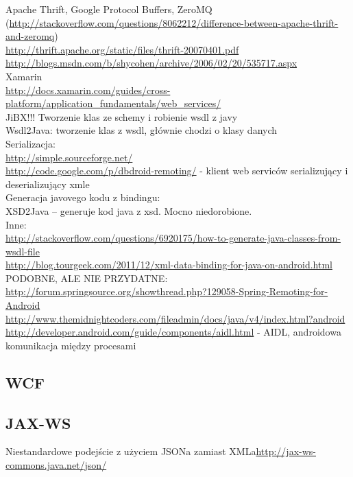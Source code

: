 \documentclass[twoside,a4paper]{book}
\begin{document}
Apache Thrift, Google Protocol Buffers, ZeroMQ (\url{http://stackoverflow.com/questions/8062212/difference-between-apache-thrift-and-zeromq})\\
\url{http://thrift.apache.org/static/files/thrift-20070401.pdf}\\
\url{http://blogs.msdn.com/b/shycohen/archive/2006/02/20/535717.aspx}\\
Xamarin\\
\url{http://docs.xamarin.com/guides/cross-platform/application_fundamentals/web_services/}\\

JiBX!!! Tworzenie klas ze schemy i robienie wsdl z javy\\
Wsdl2Java: tworzenie klas z wsdl, głównie chodzi o klasy danych\\

Serializacja:\\
\url{http://simple.sourceforge.net/}\\
\url{http://code.google.com/p/dbdroid-remoting/} - klient web serviców serializujący i deserializujący xmle\\
Generacja javovego kodu z bindingu:\\
XSD2Java – generuje kod java z xsd. Mocno niedorobione.\\
Inne:\\
\url{http://stackoverflow.com/questions/6920175/how-to-generate-java-classes-from-wsdl-file}\\
\url{http://blog.tourgeek.com/2011/12/xml-data-binding-for-java-on-android.html}\\
PODOBNE, ALE NIE PRZYDATNE:\\

\url{http://forum.springsource.org/showthread.php?129058-Spring-Remoting-for-Android}\\
\url{http://www.themidnightcoders.com/fileadmin/docs/java/v4/index.html?android}\\
\url{http://developer.android.com/guide/components/aidl.html} - AIDL, androidowa komunikacja między procesami\\


\subsection{WCF}
\subsection{JAX-WS}
Niestandardowe podejście z użyciem JSONa zamiast XMLa\url{http://jax-ws-commons.java.net/json/}\\
\end{document}
